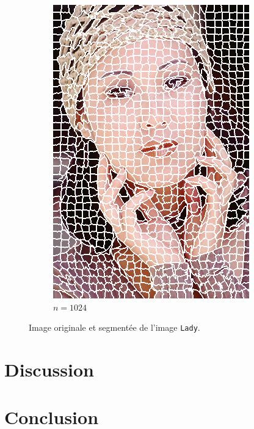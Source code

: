 \documentclass[12pt]{article}
\begin{document}
\begin{figure}
\begin{subfigure}{0.48\textwidth}
    \includegraphics[width=.8\textwidth]{lady/lady_segmented_1024.png}
    \caption{$n=1024$}
  \end{subfigure}
  \caption{Image originale et segment\'ee de l'image \texttt{Lady}.}
  \label{fig:lady_segm}
\end{figure}

\section{Discussion}

\section{Conclusion}

\AtNextBibliography{\small}
\printbibliography
\end{document}
